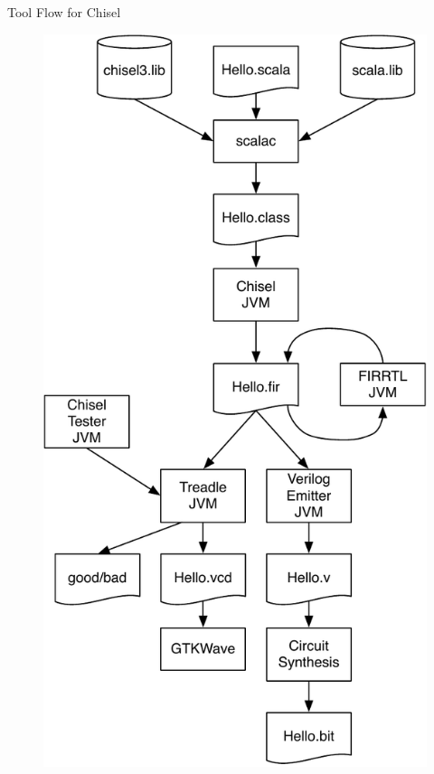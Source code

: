 \begin{frame}[fragile]{Tool Flow for Chisel}
\begin{figure}
    \centering
    \includegraphics[scale=0.35]{../figures/flow}
\end{figure}
\end{frame}


